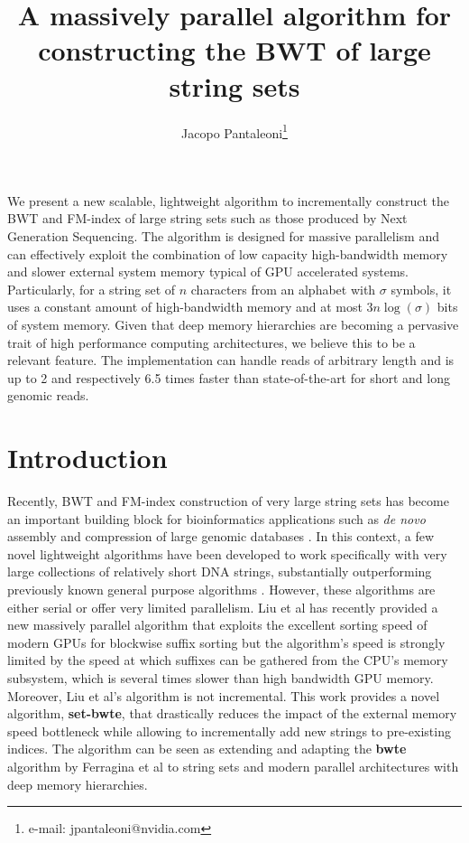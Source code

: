 \documentclass{acmsiggraph}
\title{A massively parallel algorithm for constructing the BWT of large string sets}
\author{Jacopo Pantaleoni\thanks{e-mail: jpantaleoni@nvidia.com}}
\begin{document}
\newcommand{\picresdir}{final}




\maketitle



\abstract

We present a new scalable, lightweight algorithm to incrementally construct the BWT and FM-index of large string sets such as those produced by Next Generation Sequencing.
The algorithm is designed for massive parallelism and can effectively exploit the combination of low capacity high-bandwidth memory and slower external system memory typical of GPU accelerated systems. Particularly, for a string set of $n$ characters from an alphabet with $\sigma$ symbols, it uses a constant amount of high-bandwidth memory and at most $3n \log(\sigma)$ bits of system memory. Given that deep memory hierarchies are becoming a pervasive trait of high performance computing architectures, we believe this to be a relevant
feature.
The implementation can handle reads of arbitrary length and is up to 2 and respectively 6.5 times faster than state-of-the-art for short and long genomic reads.

\section{Introduction}

Recently, BWT and FM-index construction of very large string sets has become an important building block for bioinformatics applications such as \emph{de novo} assembly \cite{Simpson:2011} and compression of large genomic databases \cite{Cox:2012}.
In this context, a few novel lightweight algorithms have been developed to work specifically with very large collections of relatively short DNA strings, substantially outperforming previously known general purpose algorithms \cite{Bauer:2011,Li:2014}.
However, these algorithms are either serial or offer very limited parallelism.
Liu et al  has recently provided a new massively parallel algorithm that exploits the excellent sorting speed of modern GPUs for blockwise suffix sorting \cite{Karkkainen:2007} but the algorithm's speed is strongly limited by the speed at which suffixes can be gathered from the CPU's memory subsystem, which is several times slower than high bandwidth GPU memory. Moreover, Liu et al's  algorithm is not incremental.
This work provides a novel algorithm, {\bf set-bwte}, that drastically reduces the impact of the external
memory speed bottleneck while allowing to incrementally add new strings to pre-existing indices.
The algorithm can be seen as extending and adapting the {\bf bwte} algorithm by Ferragina et al  to string sets and modern parallel architectures with deep memory hierarchies.
\end{document}
